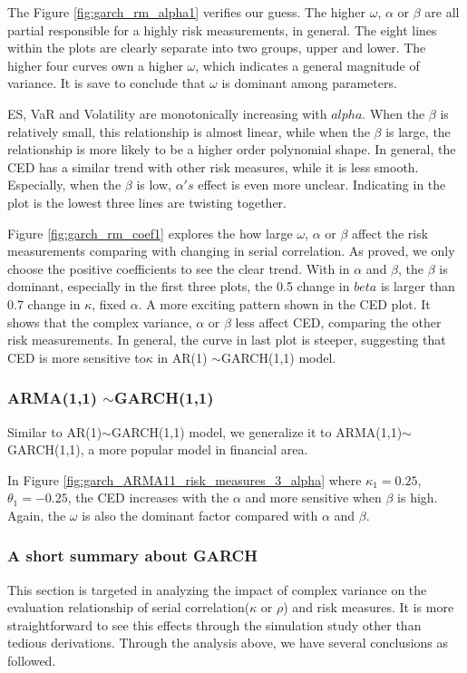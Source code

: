 \documentclass[11pt]{article}
\begin{document}
The Figure \ref{fig:garch_rm_alpha1} verifies our guess. The higher $\omega$, $\alpha$ or $\beta$ are all partial responsible for a highly risk measurements, in general. The eight lines within the plots are clearly separate into two groups, upper and lower. The higher four curves own a higher $\omega$, which indicates a general magnitude of variance. It is save to conclude that $\omega$ is dominant among parameters.

ES, VaR and Volatility are monotonically increasing with $alpha$. When the $\beta$ is relatively small, this relationship is almost linear, while when the $\beta$ is large, the relationship is more likely to be a higher order polynomial shape. In general, the CED has a similar trend with other risk measures, while it is less smooth. Especially, when the $\beta$ is low, $\alpha's$ effect is even more unclear. Indicating in the plot is the lowest three lines are twisting together. 

Figure \ref{fig:garch_rm_coef1} explores the how large $\omega$, $\alpha$ or $\beta$ affect the risk measurements comparing with changing in serial correlation. As proved, we only choose the positive coefficients to see the clear trend. With in $\alpha$ and $\beta$, the $\beta$ is dominant, especially in the first three plots, the 0.5 change in $beta$ is larger than 0.7 change in $\kappa$, fixed $\alpha$. A more exciting pattern shown in the CED plot. It shows that the complex variance, $\alpha$ or $\beta$ less affect CED, comparing the other risk measurements. In general, the curve in last plot is steeper, suggesting that CED is more sensitive to$\kappa$ in AR(1) $\sim$GARCH(1,1) model.

\subsubsection{ARMA(1,1) $\sim$GARCH(1,1)}
Similar to AR(1)$\sim$GARCH(1,1) model, we generalize it to ARMA(1,1)$\sim$GARCH(1,1), a more popular model in financial area.

In Figure \ref{fig:garch_ARMA11_risk_measures_3_alpha} where $\kappa_1 = 0.25$, $\theta_1 = -0.25$, the CED increases with the $\alpha$ and more sensitive when $\beta$ is high. Again, the $\omega$ is also the dominant factor compared with $\alpha$ and $\beta$.


\subsubsection{A short summary about GARCH}
This section is targeted in analyzing the impact of complex variance on the evaluation relationship of serial correlation($\kappa$ or $\rho$) and risk measures. It is more straightforward to see this effects through the simulation study other than tedious derivations. Through the analysis above, we have several conclusions as followed.
\end{document}
